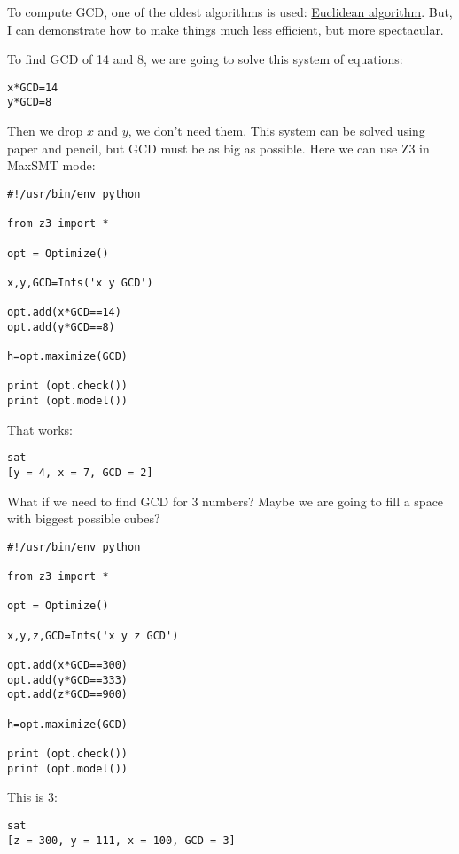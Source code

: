To compute GCD, one of the oldest algorithms is used: \href{https://en.wikipedia.org/wiki/Euclidean_algorithm}{Euclidean algorithm}.
But, I can demonstrate how to make things much less efficient, but more spectacular.

To find GCD of 14 and 8, we are going to solve this system of equations:

\begin{lstlisting}
x*GCD=14
y*GCD=8
\end{lstlisting}

Then we drop $x$ and $y$, we don't need them.
This system can be solved using paper and pencil, but GCD must be as big as possible.
Here we can use Z3 in MaxSMT mode:

\begin{lstlisting}
#!/usr/bin/env python

from z3 import *

opt = Optimize()

x,y,GCD=Ints('x y GCD')

opt.add(x*GCD==14)
opt.add(y*GCD==8)

h=opt.maximize(GCD)

print (opt.check())
print (opt.model())
\end{lstlisting}

That works:

\begin{lstlisting}
sat
[y = 4, x = 7, GCD = 2]
\end{lstlisting}

What if we need to find GCD for 3 numbers?
Maybe we are going to fill a space with biggest possible cubes?

\begin{lstlisting}
#!/usr/bin/env python

from z3 import *

opt = Optimize()

x,y,z,GCD=Ints('x y z GCD')

opt.add(x*GCD==300)
opt.add(y*GCD==333)
opt.add(z*GCD==900)

h=opt.maximize(GCD)

print (opt.check())
print (opt.model())
\end{lstlisting}

This is 3:

\begin{lstlisting}
sat
[z = 300, y = 111, x = 100, GCD = 3]
\end{lstlisting}

